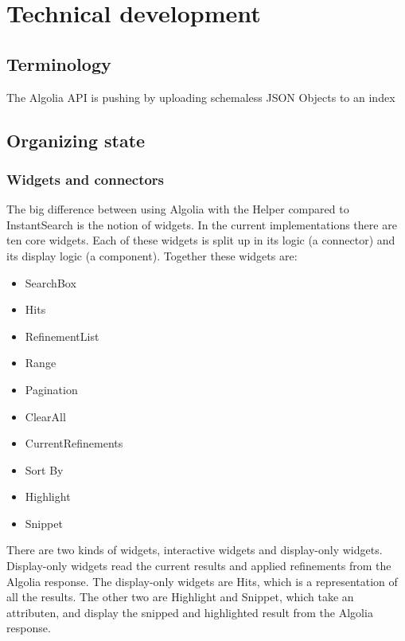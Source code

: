 
\chapter{Technical development} %
\label{chp:execution}

\section{Terminology}
\label{sec:terminology}

The Algolia API is pushing by uploading schemaless JSON Objects to an index %

\section{Organizing state} %
\label{sec:organizing_state}

\subsection{Widgets and connectors}
\label{sub:widgets_and_connectors}

The big difference between using Algolia with the Helper compared to InstantSearch is the notion of widgets. In the current implementations there are ten core widgets. Each of these widgets is split up in its logic (a connector) and its display logic (a component). Together these widgets are:

\begin{itemize}
  \item SearchBox
  \item Hits
  \item RefinementList
  \item Range
  \item Pagination
  \item ClearAll
  \item CurrentRefinements
  \item Sort By
  \item Highlight
  \item Snippet
\end{itemize}

There are two kinds of widgets, interactive widgets and display-only widgets. Display-only widgets read the current results and applied refinements from the Algolia response. The display-only widgets are Hits, which is a representation of all the results. The other two are Highlight and Snippet, which take an attributen, and display the snipped and highlighted result from the Algolia response.

